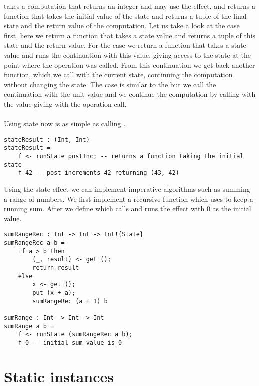  takes a computation that returns an integer and may use the  effect, and returns a function that takes the initial value of the state and returns a tuple of the final state and the return value of the computation.
Let us take a look at the  case first, here we return a function that takes a state value and returns a tuple of this state and the return value.
For the  case we return a function that takes a state value and runs the continuation  with this value, giving access to the state at the point where the  operation was called. From this continuation we get back another function, which we call with the current state, continuing the computation without changing the state.
The  case is similar to the  but we call the continuation with the unit value and we continue the computation by calling  with the value giving with the  operation call.
\\\\
Using state now is as simple as calling .

\begin{verbatim}
stateResult : (Int, Int)
stateResult =
	f <- runState postInc; -- returns a function taking the initial state
	f 42 -- post-increments 42 returning (43, 42)
\end{verbatim}

Using the state effect we can implement imperative algorithms such as summing a range of numbers.
We first implement a recursive function  which uses  to keep a running sum.
After we define  which calls  and runs the  effect with $0$ as the initial value.

\begin{verbatim}
sumRangeRec : Int -> Int -> Int!{State}
sumRangeRec a b =
	if a > b then
		(_, result) <- get ();
		return result
	else
		x <- get ();
		put (x + a);
		sumRangeRec (a + 1) b
		
sumRange : Int -> Int -> Int
sumRange a b =
	f <- runState (sumRangeRec a b);
	f 0 -- initial sum value is 0
\end{verbatim}

\section{Static instances}
\label{sec:background-staticinst}

